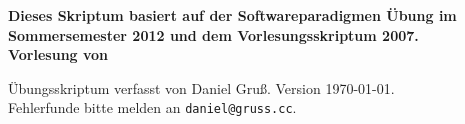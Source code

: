 
\thispagestyle{empty}

\begin{center}
\vspace*{5cm}
\huge{\textbf{\titel}}

\vspace*{1cm}

\large{\textbf{Dieses Skriptum basiert auf der Softwareparadigmen Übung im Sommersemester 2012 und dem Vorlesungsskriptum 2007.\\Vorlesung von \vortragender}}
\end{center}
\clearpage

\begin{center}
Übungsskriptum verfasst von Daniel Gruß. Version \today. \\
Fehlerfunde bitte melden an \verb|daniel@gruss.cc|.
\end{center}
\clearpage

\tableofcontents
\cleardoublepage

